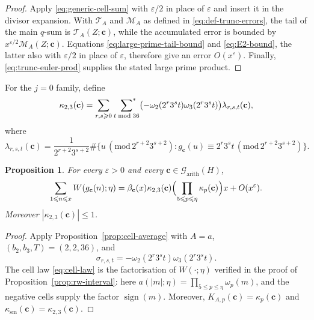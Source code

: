 \documentclass[12pt,reqno]{amsart}
\numberwithin{equation}{section}
\newtheorem{proposition}[theorem]{Proposition}
\theoremstyle{definition}
\renewcommand{\le}{\leqslant}
\renewcommand{\ge}{\geqslant}
\newcommand{\sumstar}{\sideset{}{^*}\sum}
\newcommand{\cc}{\mathbf{c}}
\DeclareMathOperator{\sign}{sign}
\newcommand{\rw}{W}
\renewcommand{\pmod}[1]{\,(\mathrm{mod}\,#1)}
\begin{document}
\begin{proof}
Apply \eqref{eq:generic-cell-sum} with $\varepsilon/2$ in place of $\varepsilon$ and insert it in the divisor expansion.
With $\mathcal T_A$ and $\mathcal M_A$ as defined in \eqref{eq:def-trunc-errors}, the tail of the main $q$-sum is $\mathcal T_A(Z;\cc)$, while the accumulated error is bounded by $x^{\varepsilon/2}\mathcal M_A(Z;\cc)$.
Equations \eqref{eq:large-prime-tail-bound} and \eqref{eq:E2-bound}, the latter also with $\varepsilon/2$ in place of $\varepsilon$, therefore give an error $O(x^\varepsilon)$.
Finally, \eqref{eq:trunc-euler-prod} supplies the stated large prime product.
\end{proof}

For the $j=0$ family, define
\begin{equation}\label{eq:kappa23-def}
\kappa_{2,3}(\cc)
=\sum_{r,s\ge0}\ \sumstar_{t\bmod36}
\bigl(-\omega_2(2^r3^s t)\omega_3(2^r3^s t)\bigr)
\lambda_{r,s,t}(\cc),
\end{equation}
where
\[
\lambda_{r,s,t}(\cc)
=\frac1{2^{r+2}3^{s+2}}
\#\{u\pmod{2^{r+2}3^{s+2}}:
g_\cc(u)\equiv2^r3^s t\pmod{2^{r+2}3^{s+2}}\}.
\]

\begin{proposition}\label{prop:asymp}
For every $\varepsilon>0$ and every $\cc\in\mathcal G_{\mathrm{arith}}(H)$,
\begin{equation}\label{eq:rw-trunc-poly}
\sum_{1\le n\le x}\rw(g_\cc(n);\eta)
=\beta_\cc(x)\kappa_{2,3}(\cc)
\Bigl(\prod_{5\le p\le\eta}\kappa_p(\cc)\Bigr)x
+O(x^\varepsilon).
\end{equation}
Moreover $|\kappa_{2,3}(\cc)|\le1$.
\end{proposition}

\begin{proof}
Apply Proposition~\ref{prop:cell-average} with $A=a$, $(b_2,b_3,T)=(2,2,36)$, and
\[
\sigma_{r,s,t}
=-\omega_2(2^r3^s t)\omega_3(2^r3^s t).
\]
The cell law \eqref{eq:cell-law} is the factorisation of $\rw(\cdot;\eta)$ verified in the proof of Proposition~\ref{prop:rw-interval}: here $a(|m|;\eta)=\prod_{5\le p\le\eta}\omega_p(m)$, and the negative cells supply the factor $\sign(m)$.
Moreover, $K_{A,p}(\cc)=\kappa_p(\cc)$ and $\kappa_{\mathrm{sm}}(\cc)=\kappa_{2,3}(\cc)$.
\end{proof}
\end{document}
